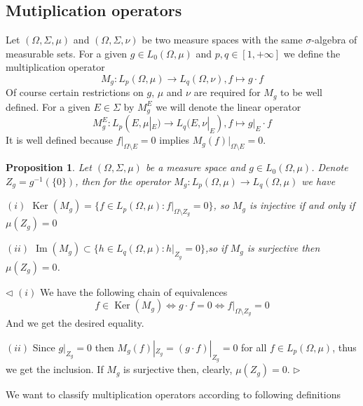 \documentclass[12pt]{article}
\newtheorem{proposition}[theorem]{Proposition}
\newenvironment{proof}{\par $\triangleleft$}{$\triangleright$}
\begin{document}

\subsection{Mutiplication operators}

Let $(\Omega,\Sigma,\mu)$ and $(\Omega,\Sigma,\nu)$ be two measure spaces with
the same $\sigma$-algebra of measurable sets. For a given $g\in L_0(\Omega,\mu)$
and $p,q\in[1,+\infty]$ we define the multiplication operator
$$
    M_g:L_p(\Omega,\mu)\to L_q(\Omega,\nu), f\mapsto g\cdot f
$$
Of course certain restrictions on $g$, $\mu$ and $\nu$ are required for $M_g$ to
be well defined. For a given $E\in\Sigma$ by $M_g^E$ we will denote the linear
operator
$$
    M_g^E:L_p(E,\mu|_E)\to L_q(E,\nu|_E),f\mapsto g|_E\cdot f
$$
It is well defined because $f|_{\Omega\setminus E}=0$ implies
$M_g(f)|_{\Omega\setminus E}=0$.

\begin{proposition}\label{MultpOpSurjInjDesc} Let $(\Omega,\Sigma,\mu)$ be a
    measure space and $g\in L_0(\Omega,\mu)$. Denote $Z_g=g^{-1}( \{0 \})$,
    then for the operator $M_g:L_p(\Omega,\mu)\to L_q(\Omega,\mu)$ we have

    $(i)$ $\operatorname{Ker}(M_g)= \{f\in L_p(\Omega,\mu):f|_{\Omega\setminus
        {Z_g}}=0 \}$, so $M_g$ is injective if and only if $\mu(Z_g)=0$

    $(ii)$ $\operatorname{Im}(M_g)\subset \{h\in L_q(\Omega,\mu): h|_{Z_g}=0
        \}$,so if $M_g$ is surjective then $\mu(Z_g)=0$.

\end{proposition}
\begin{proof}
    $(i)$ We have the following chain of equivalences
    $$
        f\in\operatorname{Ker}(M_g)
        \Longleftrightarrow g\cdot f=0
        \Longleftrightarrow f|_{\Omega\setminus Z_g}=0
    $$
    And we get the desired equality.

    $(ii)$ Since $g|_{Z_g}=0$ then $M_g(f)|_{Z_g}=(g\cdot f)|_{Z_g}=0$ for all
    $f\in L_p(\Omega,\mu)$, thus we get the inclusion. If $M_g$ is surjective
    then, clearly,  $\mu(Z_g)=0$.
\end{proof}
\newline

We want to classify multiplication operators according to following definitions
\end{document}
